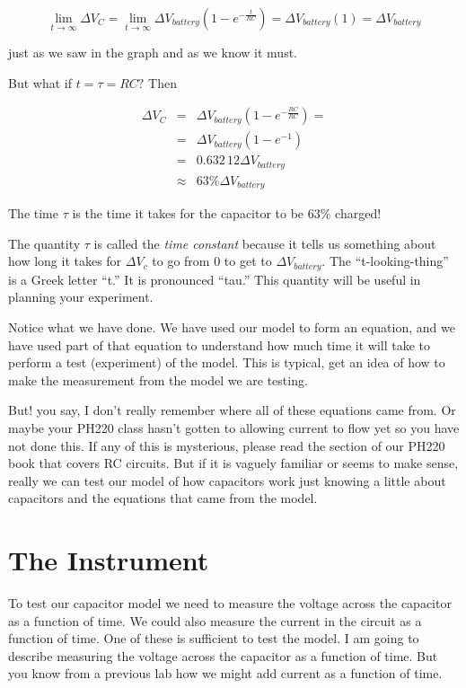 \begin{equation*}
	\underset{t\rightarrow \infty }{\lim }\Delta V_{C}=\underset{t\rightarrow\infty }{\lim }\Delta V_{battery}\left( 1-e^{-\frac{t}{RC}}\right) =\Delta V_{battery}\left( 1\right) =\Delta V_{battery}
\end{equation*}

\noindent just as we saw in the graph and as we know it must.

But what if $t=\tau =RC?$ Then 

\begin{eqnarray*}
	\Delta V_{C} &=&\Delta V_{battery}\left( 1-e^{-\frac{RC}{RC}}\right) = \\
	             &=&\Delta V_{battery}\left( 1-e^{-1}\right) \\
	             &=&\allowbreak 0.632\,12\Delta V_{battery} \\
	             &\approx &63\%\Delta V_{battery}
\end{eqnarray*}

The time $\tau $ is the time it takes for the capacitor to be $63\%$ charged!

The quantity $\tau $ is called the \emph{time constant} because it tells us something about how long it takes for $\Delta V_{c}$ to go from $0$ to get to $\Delta V_{battery}.$ The ``t-looking-thing'' is a Greek letter ``t.'' It is pronounced ``tau.'' This quantity will be useful in planning your experiment.

Notice what we have done. We have used our model to form an equation, and we have used part of that equation to understand how much time it will take to perform a test (experiment) of the model. This is typical, get an idea of how to make the measurement from the model we are testing.

But! you say, I don't really remember where all of these equations came from. Or maybe your PH220 class hasn't gotten to allowing current to flow yet so you have not done this. If any of this is mysterious, please read the section of our PH220 book that covers RC circuits. But if it is vaguely familiar or seems to make sense, really we can test our model of how capacitors work just knowing a little about capacitors and the equations that came from the model.

\section{The Instrument}

To test our capacitor model we need to measure the voltage across the capacitor as a function of time. We could also measure the current in the circuit as a function of time. One of these is sufficient to test the model. I am going to describe measuring the voltage across the capacitor as a function of time. But you know from a previous lab how we might add current as a function of time.


